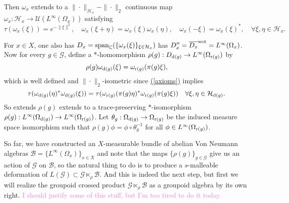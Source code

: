 \documentclass[a4paper,11pt]{article}
\renewcommand{\eqref}[1]{\hyperref[#1]{(\ref{#1})}}
\numberwithin{equation}{section}
\theoremstyle{definition}
\theoremstyle{remark}
\numberwithin{equation}{section}
\newcommand{\rG}{\mathcal{G}}
\def\H{\mathcal H}
\newcommand{\ol}[1]{\overline{#1}}
\newcommand{\spn}{{\rm span}}
\newcommand{\wot}{{\rm wot}}
\newcommand{\U}{\mathcal{U}}
\def\r{{\rm r}}
\def\d{{\rm d}}
\def\CC{\mathbb C}
\numberwithin{equation}{section}
\begin{document}
Then $\omega_x$ extends to a $\|\cdot\|_{\H_x} - \|\cdot\|_2$ continuous map $\omega_x : \H_x \to \U(L^\infty(\Omega_x))$ satisfying 
\begin{equation} \label{axioms}
\tau(\omega_x(\xi)) = e^{-\|\xi\|^2}, \quad \omega_x(\xi + \eta) = \omega_x(\xi)\omega_x(\eta), \quad \omega_x(-\xi) = \omega_x(\xi)^*, \quad \forall\xi, \eta \in\H_x.
\end{equation}

For $x \in X$, one also has $D_x = \spn_\CC (\{\omega_x(\xi)\}_{\xi \in \H_x})$ has $D_x'' = \ol{D_x}^\wot = L^\infty(\Omega_x)$. Now for every $g\in\rG$, define a $*$-homomorphism $\rho(g): D_{\d(g)} \to L^\infty(\Omega_{\r(g)})$ by 
$$
\rho(g)\omega_{\d(g)}(\xi) = \omega_{\r(g)}(\pi(g)\xi),
$$
which is well defined and $\|\cdot\|_2$-isometric since \eqref{axioms} implies 
$$
\tau(\omega_{\d(g)}(\eta)^*\omega_{\d(g)}(\xi)) = \tau(\omega_{\r(g)}(\pi(g)\eta)^*\omega_{\r(g)}(\pi(g)\xi)) \quad \forall\xi, \eta \in \H_{\d(g)}.
$$
So extends $\rho(g)$ extends to a trace-preserving $*$-isomorphism $\rho(g): L^\infty(\Omega_{\d(g)}) \to L^\infty(\Omega_{\r(g)})$.  
Let $\theta_{g}: \Omega_{\d(g)} \to \Omega_{\r(g)}$ be the induced measure space isomorphism such that $\rho(g)\phi = \phi\circ \theta_{g}^{-1}$ for all $\phi \in L^\infty(\Omega_{\r(g)})$. 

So far, we have constructed an $X$-measurable bundle of abelian Von Neumann algebras $\mathcal B=\{L^\infty(\Omega_{x})\}_{x\in X}$ and note that the maps $\{\rho(g)\}_{g\in \rG}$ give us an action of $\rG$ on $\mathcal B$, so the natural thing to do is to produce a $s$-malleable deformation of $L(\rG)\subset \rG\ltimes_\rho \mathcal B$. And this is indeed the next step, but first we will realize the groupoid crossed product $\rG\ltimes_\rho \mathcal B$ as a groupoid algebra by its own right. \textcolor{violet}{I should justify some of this stuff, but I'm too tired to do it today.}
\end{document}
